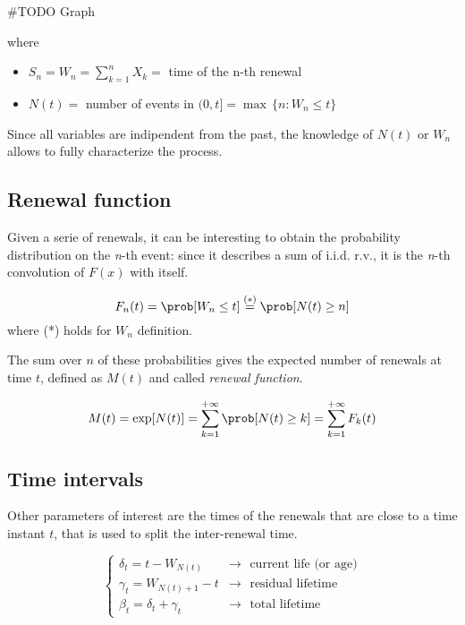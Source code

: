 	\#TODO Graph

	where
	\begin{itemize}
		\item $ S_n = W_n = \sum\limits_{k=1}^n X_k =$ time of the n-th renewal
		\item $ N(t) = $ number of events in $(0, t] = \max\,\{n : W_n \le t \}$
	\end{itemize}

	Since all variables are indipendent from the past, the knowledge of $N(t)$ or $W_n$ allows to fully characterize the process.

\subsection{Renewal function}
	Given a serie of renewals, it can be interesting to obtain the probability distribution on the \emph{n}-th event: since it describes a sum of i.i.d. r.v., it is the \emph{n}-th convolution of $F(x)$ with itself.

	\begin{equation}
		F_n(t) = \prob[W_n \le t] \stackrel{(*)}{=} \prob[N(t) \ge n]
	\end{equation}
	where (*) holds for $W_n$ definition.

		\begin{definition}
			The sum over $n$ of these probabilities gives the expected number of renewals at time $t$, defined as $M(t)$ and called \emph{renewal function}.

			\begin{equation}
				M(t) = \exp[N(t)] = \sum\limits_{k=1}^{+\infty}\prob[N(t)\ge k] = \sum\limits_{k=1}^{+\infty} F_k(t)
			\end{equation}
		\end{definition}

\subsection{Time intervals}
	Other parameters of interest are the times of the renewals that are close to a time instant $t$, that is used to split the inter-renewal time.

	\begin{equation} \begin{cases}
		\delta_t = t - W_{N(t)} & \rightarrow
			\text{~~current life (or age)} \\
		\gamma_t = W_{N(t)+1}-t & \rightarrow
			\text{~~residual lifetime} \\
		\beta_t = \delta_t + \gamma_t & \rightarrow
			\text{~~total lifetime}
	\end{cases} \end{equation}

